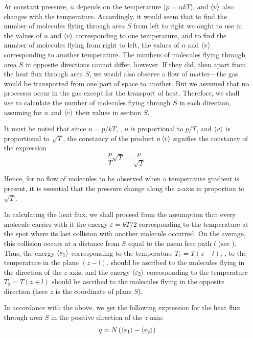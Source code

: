 At constant pressure, $n$ depends on the temperature ($p=nkT$), and $\left\langle v \right\rangle$ also changes with the temperature. Accordingly, it would seem that to find the number of molecules flying through area $S$ from left to right we ought to use in  the values of $n$ and $\left\langle v \right\rangle$ corresponding to one temperature, and to find the number of molecules flying from right to left, the values of $n$ and $\left\langle v \right\rangle$ corresponding to another temperature. The numbers of molecules flying through area $S$ in opposite directions cannot differ, however. If they did, then apart from the heat flux through area $S$, we would also observe a flow of matter---the gas would be transported from one part of space to another. But we assumed that no processes occur in the gas except for the transport of heat. Therefore, we shall use  to calculate the number of molecules flying through $S$ in each direction, assuming for $n$ and $\left\langle v \right\rangle$ their values in section $S$.

It must be noted that since $n=p/kT$, \ie, $n$ is proportional to $p/T$, and $\left\langle v \right\rangle$ is proportional to $\sqrt{T}$, the constancy of the product $n\left\langle v \right\rangle$ signifies the constancy of the expression
\begin{equation*}
    \frac{p}{T}\sqrt{T} = \frac{p}{\sqrt{T}}.
\end{equation*}

\noindent
Hence, for no flow of molecules to be observed when a temperature gradient is present, it is essential that the pressure change along the $z$-axis in proportion to $\sqrt{T}$.

In calculating the heat flux, we shall proceed from the assumption that every molecule carries with it the energy $\varepsilon=kT/2$ corresponding to the temperature at the spot where its last collision with another molecule occurred. On the average, this collision occurs at a distance from $S$ equal to the mean free path $l$ (see ). Thus, the energy $\left\langle \varepsilon_1 \right\rangle$ corresponding to the temperature $T_1=T(z-l)$, \ie, to the temperature in the plane $(z-l)$, should be ascribed to the molecules flying in the direction of the $z$-axis, and the energy $\left\langle \varepsilon_2 \right\rangle$ corresponding to the temperature $T_2=T(z+l)$ should be ascribed to the molecules flying in the opposite direction (here $z$ is the coordinate of plane $S$).

In accordance with the above, we get the following expression for the heat flux through area $S$ in the positive direction of the $z$-axis:
\begin{equation*}
    q = N\left(\left\langle \varepsilon_1 \right\rangle - \left\langle \varepsilon_2 \right\rangle\right)
\end{equation*}

